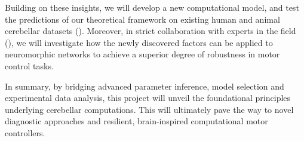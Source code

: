 \documentclass[a4paper, 10pt]{article}
\begin{document}
Building on these insights, we will develop a new computational model, and test
the predictions of our theoretical framework on existing human and animal
cerebellar datasets (\cite{Kumar2022PhysiologicalRO, 10.1242/dmm.049514}).
Moreover, in strict collaboration with experts in the field
(\cite{Ribar2020NeuromorphicCD}), we will investigate how the newly discovered
factors can be applied to neuromorphic networks to achieve a superior degree of
robustness in motor control tasks.

In summary, by bridging advanced parameter inference, model selection and
experimental data analysis, this project will unveil the foundational principles
underlying cerebellar computations. This will ultimately pave the way to novel
diagnostic approaches and resilient, brain-inspired computational motor
controllers.




\printbibliography
\end{document}

